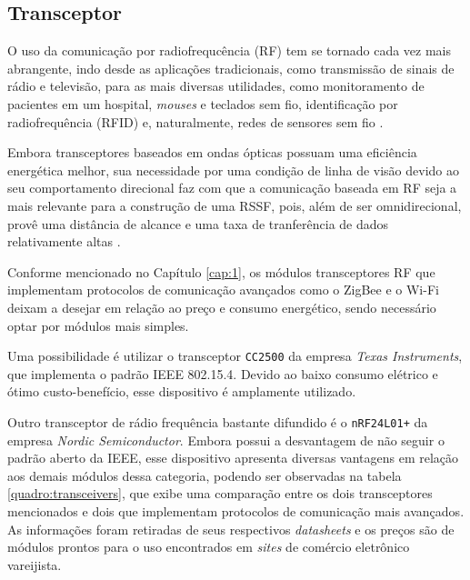 \subsection{Transceptor}
O uso da comunicação por radiofrequcência (RF) tem se tornado cada vez mais abrangente, indo desde as
aplicações tradicionais, como transmissão de sinais de rádio e televisão, para as mais diversas utilidades,
como monitoramento de pacientes em um hospital, \textit{mouses} e teclados sem fio, identificação por
radiofrequência (RFID) e, naturalmente, redes de sensores sem fio \cite{misra2001}.

Embora transceptores baseados em ondas ópticas possuam uma eficiência energética melhor, sua necessidade por
uma condição de linha de visão devido ao seu comportamento direcional faz com que a comunicação baseada em RF
seja a mais relevante para a construção de uma RSSF, pois, além de ser omnidirecional, provê uma distância de
alcance e uma taxa de tranferência de dados relativamente altas \cite{kuorilehto2007,karl_willig2005}.

Conforme mencionado no Capítulo \ref{cap:1}, os módulos transceptores RF que implementam protocolos de
comunicação avançados como o ZigBee e o Wi-Fi deixam a desejar em relação ao preço e consumo energético,
sendo necessário optar por módulos mais simples.

Uma possibilidade é utilizar o transceptor \texttt{CC2500} da empresa \textit{Texas Instruments}, que
implementa o padrão IEEE 802.15.4. Devido ao baixo consumo elétrico e ótimo custo-benefício, esse dispositivo
é amplamente utilizado.

Outro transceptor de rádio frequência bastante difundido é o \texttt{nRF24L01+} da empresa \textit{Nordic
Semiconductor}. Embora possui a desvantagem de não seguir o padrão aberto da IEEE, esse dispositivo apresenta
diversas vantagens em relação aos demais módulos dessa categoria, podendo ser observadas na tabela
\ref{quadro:transceivers}, que exibe uma comparação entre os dois transceptores mencionados e dois que
implementam protocolos de comunicação mais avançados. As informações foram retiradas de seus respectivos
\textit{datasheets} e os preços são de módulos prontos para o uso encontrados em \textit{sites} de comércio
eletrônico vareijista.

